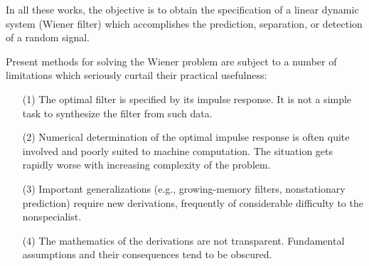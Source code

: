 \documentclass{article}
\begin{document}
In all these works, the objective is to obtain the specification of a linear dynamic system (Wiener filter) which accomplishes the prediction, separation, or detection of a random signal.

Present methods for solving the Wiener problem are subject to a number of limitations which seriously curtail their practical usefulness:
\begin{itemize}
\item[(1)] The optimal filter is specified by its impulse response. It is not a simple task to synthesize the filter from such data.
\item[(2)] Numerical determination of the optimal impulse response is often quite involved and poorly suited to machine computation. The situation gets rapidly worse with increasing complexity of the problem.
\item[(3)] Important generalizations (e.g., growing-memory filters, nonstationary prediction) require new derivations, frequently of considerable difficulty to the nonspecialist.
\item[(4)] The mathematics of the derivations are not transparent. Fundamental assumptions and their consequences tend to be obscured.
\end{itemize}
\end{document}
